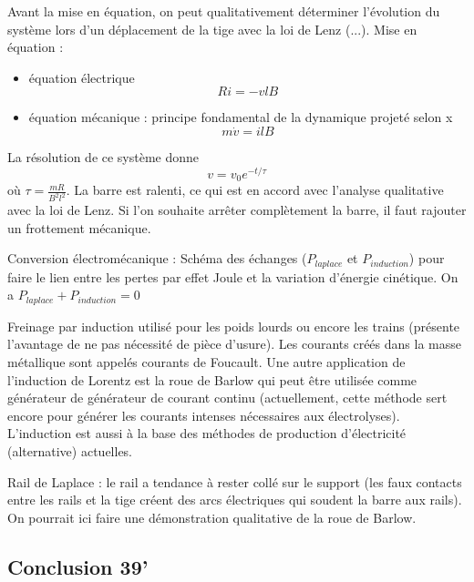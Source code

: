 Avant la mise en équation, on peut qualitativement déterminer l'évolution du système lors d'un déplacement de la tige avec la loi de Lenz (...).
Mise en équation :
\begin{itemize}
\item équation électrique
\begin{equation}
Ri = -vlB
\end{equation}
\item équation mécanique : principe fondamental de la dynamique projeté selon x
\begin{equation}
m\dot{v} = ilB
\end{equation}
\end{itemize}
La résolution de ce système donne 
\begin{equation}
v = v_0 e^{-t/\tau}
\end{equation}
où $\tau = \frac{mR}{B^2 l^2}$.
La barre est ralenti, ce qui est en accord avec l'analyse qualitative avec la loi de Lenz.
Si l'on souhaite arrêter complètement la barre, il faut rajouter un frottement mécanique.

Conversion électromécanique :
Schéma des échanges ($P_{laplace}$ et $P_{induction}$) pour faire le lien entre les pertes par effet Joule et la variation d'énergie cinétique.
On a $P_{laplace} + P_{induction} = 0$

\begin{slide}
Freinage par induction utilisé pour les poids lourds ou encore les trains (présente l'avantage de ne pas nécessité de pièce d'usure).
Les courants créés dans la masse métallique sont appelés courants de Foucault.
Une autre application de l'induction de Lorentz est la roue de Barlow qui peut être utilisée comme générateur de générateur de courant continu (actuellement, cette méthode sert encore pour générer les courants intenses nécessaires aux électrolyses).
L'induction est aussi à la base des méthodes de production d'électricité (alternative) actuelles.
\end{slide}

\begin{experience}
Rail de Laplace : le rail a tendance à rester collé sur le support (les faux contacts entre les rails et la tige créent des arcs électriques qui soudent la barre aux rails).
On pourrait ici faire une démonstration qualitative de la roue de Barlow.
\end{experience}

\subsection*{Conclusion 39'}


